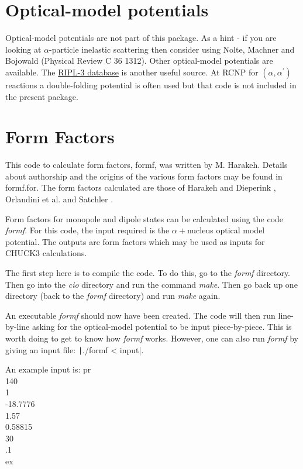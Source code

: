 \documentclass[a4paper,10pt]{article}
\begin{document}
\section{Optical-model potentials}

Optical-model potentials are not part of this package. As a hint - if you are looking at $\alpha$-particle inelastic scattering then consider using Nolte, Machner and Bojowald (Physical Review C 36 1312). Other optical-model potentials are available. The \href{https://www-nds.iaea.org/RIPL-3/}{RIPL-3 database} is another useful source. At RCNP for $(\alpha,\alpha^\prime)$ reactions a double-folding potential is often used but that code is not included in the present package.

\section{Form Factors}

This code to calculate form factors, formf, was written by M. Harakeh. Details about authorship and the origins of the various form factors may be found in formf.for. The form factors calculated are those of Harakeh and Dieperink \cite{dummy}, Orlandini et al. \cite{dummy} and Satchler \cite{dummy}.

Form factors for monopole and dipole states can be calculated using the code {\it formf}. For this code, the input required is the $\alpha+$nucleus optical model potential. The outputs are form factors which may be used as inputs for CHUCK3 calculations.

The first step here is to compile the code. To do this, go to the {\it formf} directory. Then go into the {\it cio} directory and run the command {\it make}. Then go back up one directory (back to the {\it formf} directory) and run {\it make} again.

An executable {\it formf} should now have been created. The code will then run line-by-line asking for the optical-model potential to be input piece-by-piece. This is worth doing to get to know how {\it formf} works. However, one can also run {\it formf} by giving an input file: \texttt|./formf < input|.

An example input is:
\newline
\noindent pr\\
140\\
1\\
-18.7776\\
1.57\\
0.58815\\
30\\
.1\\
ex\\
\end{document}
